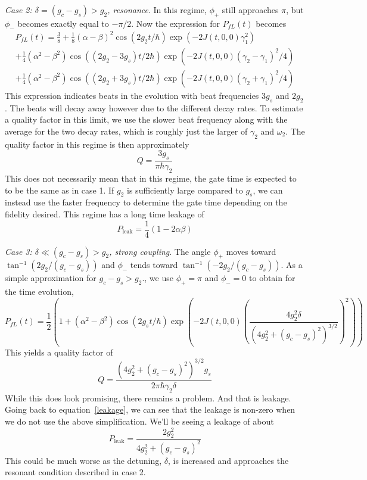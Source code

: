 \emph{Case 2: $\delta = (g_c-g_s) > g_{2}$, resonance}. In this regime, $\phi_+$ still approaches $\pi$, but $\phi_-$ becomes exactly equal to $-\pi/2$. Now the expression for $P_{fL}(t)$ becomes
\begin{multline}
    P_{fL}(t) = \frac{3}{8} + \frac{1}{8}(\alpha-\beta)^2\cos(2g_{2}t/\hbar)\exp\left( -2J(t,0,0) \gamma_1^2 \right) \\
    + \frac{1}{4}(\alpha^2-\beta^2)\cos((2g_{2}-3g_s)t/2\hbar)\exp\left( -2J(t,0,0) (\gamma_2-\gamma_1)^2/4 \right) \\
    + \frac{1}{4}(\alpha^2-\beta^2)\cos((2g_{2}+3g_s)t/2\hbar)\exp\left( -2J(t,0,0) (\gamma_2+\gamma_1)^2/4 \right)
\end{multline}
This expression indicates beats in the evolution with beat frequencies $3g_s$ and $2g_{2}$. The beats will decay away however due to the different decay rates. To estimate a quality factor in this limit, we use the slower beat frequency along with the average for the two decay rates, which is roughly just the larger of $\gamma_2$ and $\omega_2$. The quality factor in this regime is then approximately
\begin{equation}
    Q = \frac{3g_s}{\pi\hbar\gamma_2}
\end{equation}
This does not necessarily mean that in this regime, the gate time is expected to to be the same as in case 1. If $g_{2}$ is sufficiently large compared to $g_s$, we can instead use the faster frequency to determine the gate time depending on the fidelity desired. This regime has a long time leakage of
\begin{equation}
    P_\textrm{leak} = \frac{1}{4}(1-2\alpha\beta)
\end{equation}

\emph{Case 3: $\delta \ll (g_c-g_s) > g_{2}$, strong coupling}. The angle $\phi_+$ moves toward $\tan^{-1}(2g_{2}/(g_c-g_s))$ and $\phi_-$ tends toward $\tan^{-1}(-2g_{2}/(g_c-g_s))$. As a simple approximation for $g_c-g_s>g_{2}$., we use $\phi_+ = \pi$ and $\phi_-=0$ to obtain for the time evolution,
\begin{equation}
    P_{fL}(t) = \frac{1}{2}\left(1+(\alpha^2-\beta^2)\cos(2g_st/\hbar)\exp\left( -2J(t,0,0)\left( \frac{4g_{2}^2\delta}{(4g_{2}^2 + (g_c-g_s)^2)^{3/2}} \right)^2 \right)\right)
\end{equation}
This yields a quality factor of
\begin{equation}
    Q = \frac{(4g_{2}^2 + (g_c-g_s)^2)^{3/2}g_s}{2\pi\hbar\gamma_2\delta}
\end{equation}
While this does look promising, there remains a problem. And that is leakage. Going back to equation~\ref{leakage}, we can see that the leakage is non-zero when we do not use the above simplification. We'll be seeing a leakage of about
\begin{equation}
    P_\textrm{leak} = \frac{2g_{2}^2}{4g_{2}^2+(g_c-g_s)^2}
\end{equation}
This could be much worse as the detuning, $\delta$, is increased and approaches the resonant condition described in case 2.